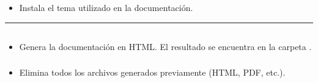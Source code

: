 \documentclass[a4paper,10pt,oneside,spanish,openany]{sphinxmanual}
\begin{document}
\subsubsection{}
\label{\detokenize{comandos_mas_usados/comandos:instalar-un-tema}}
\begin{sphinxVerbatim}[commandchars=\\\{\}]
  
\end{sphinxVerbatim}
\begin{itemize}
\item {} 
\sphinxAtStartPar
Instala el tema utilizado en la documentación.

\end{itemize}


\bigskip\hrule\bigskip



\subsection{}
\label{\detokenize{comandos_mas_usados/comandos:generacion-de-documentacion}}

\subsubsection{}
\label{\detokenize{comandos_mas_usados/comandos:para-generar-documentacion-en-formato-html}}
\begin{sphinxVerbatim}[commandchars=\\\{\}]
 
\end{sphinxVerbatim}
\begin{itemize}
\item {} 
\sphinxAtStartPar
Genera la documentación en HTML. El resultado se encuentra en la carpeta .

\end{itemize}


\subsubsection{}
\label{\detokenize{comandos_mas_usados/comandos:para-limpiar-los-archivos-generados}}
\begin{sphinxVerbatim}[commandchars=\\\{\}]
 
\end{sphinxVerbatim}
\begin{itemize}
\item {} 
\sphinxAtStartPar
Elimina todos los archivos generados previamente (HTML, PDF, etc.).

\end{itemize}
\end{document}
